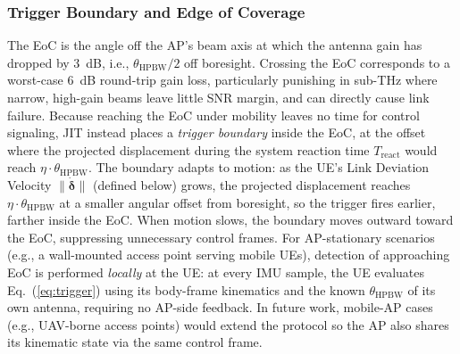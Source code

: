 \documentclass[fleqn,10pt]{wlscirep}
\newcommand{\rev}[1]{#1}
\begin{document}
\rev{\subsubsection*{Trigger Boundary and Edge of Coverage}
The EoC is the angle off the AP's beam axis at which the antenna gain has dropped by \SI{3}{\deci\bel}, i.e., $\theta_{\text{HPBW}}/2$ off boresight. Crossing the EoC corresponds to a worst-case \SI{6}{\deci\bel} round-trip gain loss, particularly punishing in sub-THz where narrow, high-gain beams leave little SNR margin, and can directly cause link failure. Because reaching the EoC under mobility leaves no time for control signaling, JIT instead places a \emph{trigger boundary} inside the EoC, at the offset where the projected displacement during the system reaction time $T_{\text{react}}$ would reach $\eta \cdot \theta_{\text{HPBW}}$. The boundary adapts to motion: as the UE's Link Deviation Velocity $\|\dot{\boldsymbol{\delta}}\|$ (defined below) grows, the projected displacement reaches $\eta \cdot \theta_{\text{HPBW}}$ at a smaller angular offset from boresight, so the trigger fires earlier, farther inside the EoC. When motion slows, the boundary moves outward toward the EoC, suppressing unnecessary control frames. For AP-stationary scenarios (e.g., a wall-mounted access point serving mobile UEs), detection of approaching EoC is performed \emph{locally} at the UE: at every IMU sample, the UE evaluates Eq.~(\ref{eq:trigger}) using its body-frame kinematics and the known $\theta_{\text{HPBW}}$ of its own antenna, requiring no AP-side feedback. In future work, mobile-AP cases (e.g., UAV-borne access points) would extend the protocol so the AP also shares its kinematic state via the same control frame.}
\end{document}
